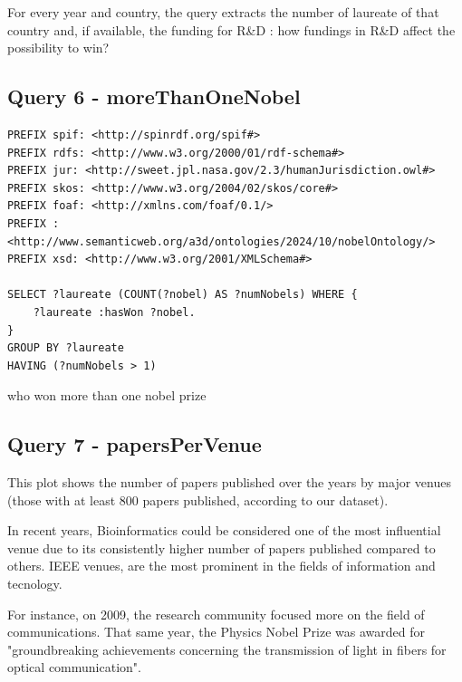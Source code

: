 \documentclass{article}
\begin{document}
For every year and country, the query extracts the number of laureate of that country and, if available, the funding for R\&D : how fundings in R\&D affect the possibility to win?
 
\subsection*{Query 6 - moreThanOneNobel}

\begin{lstlisting}
PREFIX spif: <http://spinrdf.org/spif#>
PREFIX rdfs: <http://www.w3.org/2000/01/rdf-schema#>
PREFIX jur: <http://sweet.jpl.nasa.gov/2.3/humanJurisdiction.owl#>
PREFIX skos: <http://www.w3.org/2004/02/skos/core#>
PREFIX foaf: <http://xmlns.com/foaf/0.1/>
PREFIX : <http://www.semanticweb.org/a3d/ontologies/2024/10/nobelOntology/>
PREFIX xsd: <http://www.w3.org/2001/XMLSchema#>

SELECT ?laureate (COUNT(?nobel) AS ?numNobels) WHERE {
    ?laureate :hasWon ?nobel.
}
GROUP BY ?laureate
HAVING (?numNobels > 1)    
\end{lstlisting}

who won more than one nobel prize

\subsection*{Query 7 - papersPerVenue}
This plot shows the number of papers published over the years by major
venues (those with at least 800 papers published, according to our dataset).

In recent years, Bioinformatics could be considered one of the most influential
venue due to its consistently higher number of papers published compared to others.
IEEE venues, are the most prominent in the fields of information and tecnology.

For instance, on 2009, the research community focused more on the field of
communications.
That same year, the Physics Nobel Prize was awarded for "groundbreaking achievements
concerning the transmission of light in fibers for optical communication".
\end{document}
